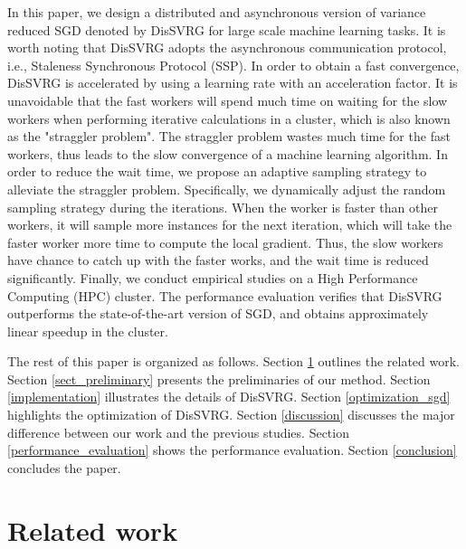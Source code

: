 \documentclass[preprint,review,11pt,a4paper]{elsarticle}
\begin{document}
In this paper, we design a distributed and asynchronous version of variance reduced SGD denoted by DisSVRG for large scale machine learning tasks. It is worth noting that DisSVRG adopts the asynchronous communication protocol, i.e., Staleness Synchronous Protocol (SSP). In order to obtain a fast convergence, DisSVRG is accelerated by using a learning rate with an acceleration factor. It is unavoidable that the fast workers will spend much time on waiting for the slow workers when performing iterative calculations  in a cluster, which is also known as the "straggler problem". The straggler problem wastes much time for the fast workers, thus leads to the slow convergence of a machine learning algorithm. In order to reduce the wait time, we propose an adaptive sampling strategy to alleviate the straggler problem. Specifically, we dynamically adjust the random sampling strategy during the iterations. When the worker is faster than other workers, it will  sample more instances for the next iteration, which will take the faster worker more time to compute the local gradient.   Thus, the slow workers have chance to catch up with the faster works, and  the wait time is reduced significantly. Finally, we conduct empirical studies on a High Performance Computing (HPC) cluster. The performance evaluation verifies that DisSVRG outperforms the state-of-the-art version of SGD, and obtains approximately linear speedup in the cluster.


The rest of this paper is organized as follows. Section \ref{related_work} outlines the related work. Section \ref{sect_preliminary} presents the preliminaries of our method. Section \ref{implementation} illustrates the details of DisSVRG. Section \ref{optimization_sgd} highlights the  optimization of DisSVRG. Section \ref{discussion} discusses the major difference between our work and the previous studies. Section \ref{performance_evaluation} shows the performance evaluation. Section \ref{conclusion} concludes the paper.


\section{Related work}
\label{related_work}
\end{document}
